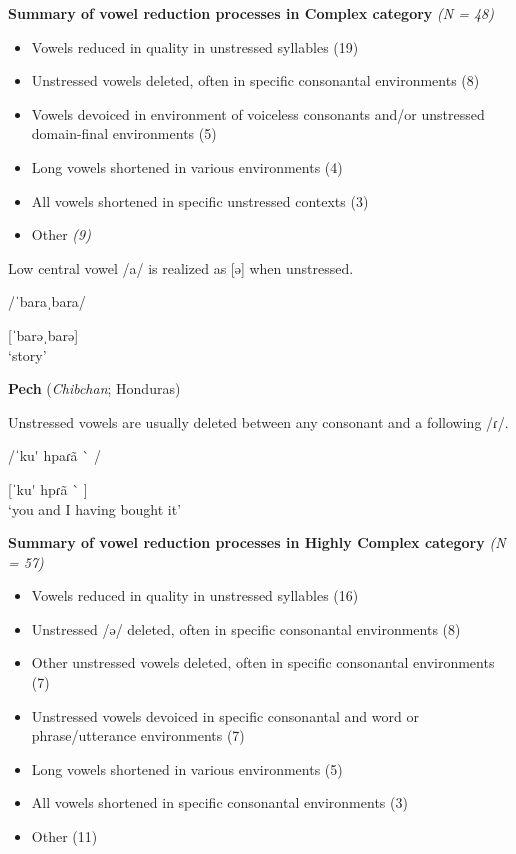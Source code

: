 \ea\label{ex:6.18}
  \textbf{Summary of vowel reduction processes in Complex category} \textit{(N = 48)}

\begin{itemize}
\item Vowels reduced in quality in unstressed syllables (19)
\item Unstressed vowels deleted, often in specific consonantal environments (8)
\item Vowels devoiced in environment of voiceless consonants and/or unstressed domain-final environments  {(5)}
\item Long vowels shortened in various environments  {(4)}
\item All vowels shortened in specific unstressed contexts (3)
\item Other \textit{(9)}
\end{itemize}

\ea{}

Low central vowel /a/ is realized as [ə] when unstressed.

/ˈbaraˌbara/

[ˈbarəˌbarə]\\
\glt ‘story’
\citep[17-18]{Rumsey1978}

\ex  \textbf{Pech} (\textit{Chibchan}; Honduras)

Unstressed vowels are usually deleted between any consonant and a following /ɾ/.

/ˈku\'{} hpaɾã \`{} /

[ˈku\'{} hpɾã \`{} ]\\
\glt ‘you and I having bought it’
\citep[23]{Holt1999}
\z
\z

\ea\label{ex:6.19}
  \textbf{Summary of vowel reduction processes in Highly Complex category} \textit{(N = 57)}

\begin{itemize}
\item Vowels reduced in quality in unstressed syllables (16)
\item Unstressed /ə/ deleted, often in specific consonantal environments {(8)}
\item Other unstressed vowels deleted, often in specific consonantal environments (7)
\item Unstressed vowels devoiced in specific consonantal and word or phrase/utterance environments (7)
\item Long vowels shortened in various environments (5)
\item All vowels shortened in specific consonantal environments  {(3)}
\item Other (11)
\end{itemize}

